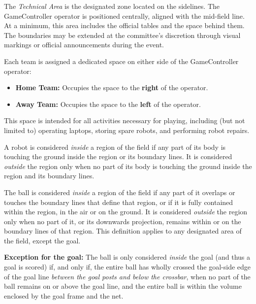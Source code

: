 \label{sec:technical_area}

The \textit{Technical Area} is the designated zone located on the sidelines. The GameController operator is positioned centrally, aligned with the mid-field line.
At a minimum, this area includes the official tables and the space behind them.
The boundaries may be extended at the committee's discretion through visual markings or official announcements during the event.

Each team is assigned a dedicated space on either side of the GameController operator:
\begin{itemize}
    \item \textbf{Home Team:} Occupies the space to the \textbf{right} of the operator.
    \item \textbf{Away Team:} Occupies the space to the \textbf{left} of the operator.
\end{itemize}

This space is intended for all activities necessary for playing, including (but not limited to) operating laptops, storing spare robots, and performing robot repairs.


\label{sec:inside_outside}
A robot is considered \textit{inside} a region of the field if any part of its body is touching the ground inside the region or its boundary lines.
 It is considered \textit{outside} the region only when no part of its body is touching the ground inside the region and its boundary lines.
 
The ball is considered \textit{inside} a region of the field if any part of it overlaps or touches the boundary lines that define that region, or if it is fully contained within the region, in the air or on the ground. It is considered \textit{outside} the region only when no part of it, or its downwards projection, remains within or on the boundary lines of that region. This definition applies to any designated area of the field, except the goal.

\textbf{Exception for the goal:} The ball is only considered \textit{inside} the goal (and thus a goal is scored) if, and only if, the entire ball has wholly crossed the goal-side edge of the goal line \emph{between the goal posts and below the crossbar}, \ie{} when no part of the ball remains on or above the goal line, and the entire ball is within the volume enclosed by the goal frame and the net.

\label{sec:venue_setup}


